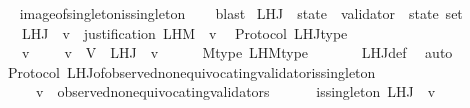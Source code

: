 \begin{isabellebody}
\ \ \isamarkupfalse%
\ image{\isacharunderscore}of{\isacharunderscore}singleton{\isacharunderscore}is{\isacharunderscore}singleton\isanewline
\ \ \isamarkupfalse%
\ blast%
\endisatagproof
{\isafoldproof}%
%
\isadelimproof
\isanewline
%
\endisadelimproof
\isanewline
\isanewline
\isanewline
\isanewline
\isanewline
{}\isamarkupfalse%
\ L{\isacharunderscore}H{\isacharunderscore}J\ {\isacharcolon}{\isacharcolon}\ {\isachardoublequoteopen}state\ {\isasymRightarrow}\ validator\ {\isasymRightarrow}\ state\ set{\isachardoublequoteclose}\isanewline
\ \ \isanewline
\ \ \ \ {\isachardoublequoteopen}L{\isacharunderscore}H{\isacharunderscore}J\ {\isasymsigma}\ v\ {\isacharequal}\ justification\ {\isacharbackquote}L{\isacharunderscore}H{\isacharunderscore}M\ {\isasymsigma}\ v{\isachardoublequoteclose}\isanewline
\isanewline
\isanewline
{}\isamarkupfalse%
\ {\isacharparenleft}\ Protocol{\isacharparenright}\ L{\isacharunderscore}H{\isacharunderscore}J{\isacharunderscore}type\ {\isacharcolon}\isanewline
\ \ {\isachardoublequoteopen}{\isasymforall}\ {\isasymsigma}\ v{\isachardot}\ {\isasymsigma}\ {\isasymin}\ {\isasymSigma}\ {\isasymand}\ v\ {\isasymin}\ V\ {\isasymlongrightarrow}\ L{\isacharunderscore}H{\isacharunderscore}J\ {\isasymsigma}\ v\ {\isasymsubseteq}\ {\isasymSigma}{\isachardoublequoteclose}\isanewline
%
\isadelimproof
\ \ %
\endisadelimproof
%
\isatagproof
{}\isamarkupfalse%
\ M{\isacharunderscore}type\ L{\isacharunderscore}H{\isacharunderscore}M{\isacharunderscore}type\ \isanewline
\ \ \ \ \ \ L{\isacharunderscore}H{\isacharunderscore}J{\isacharunderscore}def\ \isamarkupfalse%
\ auto%
\endisatagproof
{\isafoldproof}%
%
\isadelimproof
\isanewline
%
\endisadelimproof
\isanewline
{}\isamarkupfalse%
\ {\isacharparenleft}\ Protocol{\isacharparenright}\ L{\isacharunderscore}H{\isacharunderscore}J{\isacharunderscore}of{\isacharunderscore}observed{\isacharunderscore}non{\isacharunderscore}equivocating{\isacharunderscore}validator{\isacharunderscore}is{\isacharunderscore}singleton\ {\isacharcolon}\ \isanewline
\ \ {\isachardoublequoteopen}{\isasymforall}\ {\isasymsigma}\ {\isasymin}\ {\isasymSigma}{\isachardot}\ v\ {\isasymin}\ observed{\isacharunderscore}non{\isacharunderscore}equivocating{\isacharunderscore}validators\ {\isasymsigma}\isanewline
\ \ \ \ {\isasymlongrightarrow}\ is{\isacharunderscore}singleton\ {\isacharparenleft}L{\isacharunderscore}H{\isacharunderscore}J\ {\isasymsigma}\ v{\isacharparenright}{\isachardoublequoteclose}\isanewline

\end{isabellebody}
